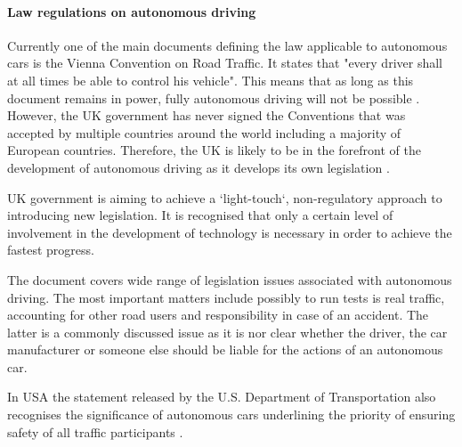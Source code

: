 \documentclass[11pt,english,twoside]{article}
\begin{document}
\paragraph{Law regulations on autonomous driving}


Currently one of the main documents defining the law applicable to autonomous cars is the Vienna Convention on Road Traffic. It states that "every driver shall at all times be able to control his vehicle". This means that as long as this document remains in power, fully autonomous driving will not be possible \citep{vienna1}. However, the UK government has never signed the Conventions that was accepted by multiple countries around the world including a majority of European countries. Therefore, the UK is likely to be in the forefront of the development of autonomous driving as it develops its own legislation \citep{telegraph}.

\par


UK government is aiming to achieve a `light-touch`, non-regulatory approach to introducing new legislation. It is recognised that only a certain level of involvement in the development of technology is necessary in order to achieve the fastest progress.
\par


\par
The \citet{pathwaytodriverless2} document covers wide range of legislation issues associated with autonomous driving. The most important matters include possibly to run tests is real traffic, accounting for other road users and  responsibility in case of an accident. The latter is a commonly discussed issue as it is nor clear whether the driver, the car manufacturer or someone else should be liable for the actions of an autonomous car. 

\par
In USA the statement released by the U.S. Department of Transportation also recognises the significance of autonomous cars underlining the priority of ensuring safety of all traffic participants \citep{nhtsa1}.
\par



\end{document}
